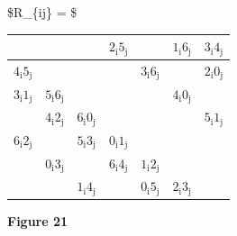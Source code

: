 \documentclass[
  12pt,
  a4paper]{book}
\begin{document}
\$R\_\{ij\} = \$

\begin{longtable}[]{@{}lllclcc@{}}
\toprule
& & & \(2_\mathrm{i}5_\mathrm{j}\) & & \(1_\mathrm{i}6_\mathrm{j}\) & \(3_\mathrm{i}4_\mathrm{j}\)\tabularnewline
\midrule
\endhead
\(4_\mathrm{i}5_\mathrm{j}\) & & & & \(3_\mathrm{i}6_\mathrm{j}\) & & \(2_\mathrm{i}0_\mathrm{j}\)\tabularnewline
\(3_\mathrm{i}1_\mathrm{j}\) & \(5_\mathrm{i}6_\mathrm{j}\) & & & & \(4_\mathrm{i}0_\mathrm{j}\) &\tabularnewline
& \(4_\mathrm{i}2_\mathrm{j}\) & \(6_\mathrm{i}0_\mathrm{j}\) & & & & \(5_\mathrm{i}1_\mathrm{j}\)\tabularnewline
\(6_\mathrm{i}2_\mathrm{j}\) & & \(5_\mathrm{i}3_\mathrm{j}\) & \(0_\mathrm{i}1_\mathrm{j}\) & & &\tabularnewline
& \(0_\mathrm{i}3_\mathrm{j}\) & & \(6_\mathrm{i}4_\mathrm{j}\) & \(1_\mathrm{i}2_\mathrm{j}\) & &\tabularnewline
& & \(1_\mathrm{i}4_\mathrm{j}\) & & \(0_\mathrm{i}5_\mathrm{j}\) & \(2_\mathrm{i}3_\mathrm{j}\) &\tabularnewline
\bottomrule
\end{longtable}

\textbf{Figure 21}
\end{document}
